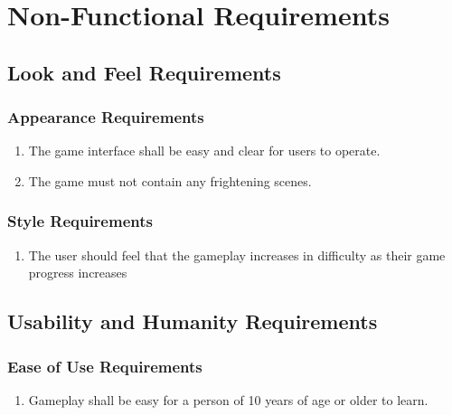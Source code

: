 \documentclass[12pt, titlepage]{article}
\begin{document}
\section{Non-Functional Requirements}
\label{sec:non-functional_requirements}
\subsection{Look and Feel Requirements}
\label{sub:look_and_feel_requirements}

\subsubsection{Appearance Requirements}
\label{ssub:appearance_requirements}
\begin{enumerate}[{LF}1. ]
        \item The game interface shall be easy and clear for users to operate.
        \item The game must not contain any frightening scenes.
\end{enumerate}

\subsubsection{Style Requirements}
\label{ssub:style_requirements}
\begin{enumerate}[{LF}3. ]
        \item The user should feel that the gameplay increases in difficulty as their game progress increases
\end{enumerate}


\subsection{Usability and Humanity Requirements}
\label{sub:usability_and_humanity_requirements}

\subsubsection{Ease of Use Requirements}
\label{ssub:ease_of_use_requirements}
\begin{enumerate}[start=1,label={ UH\arabic*.}]
        \item Gameplay shall be easy for a person of 10 years of age or older to learn.
\end{enumerate}
\end{document}
